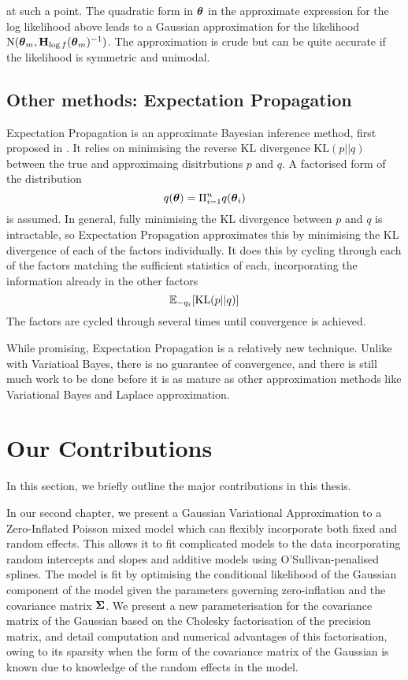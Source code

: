 \noindent at such a point. The quadratic form in ${\boldsymbol \theta}$ in the approximate expression for the log
likelihood above leads to a Gaussian approximation for the likelihood $\text{N}({\boldsymbol \theta}_m, {\bf H}_{\log
f}({\boldsymbol \theta}_m)^{-1})$. The approximation is crude but can be quite accurate if the likelihood is symmetric and
unimodal.

\subsection{Other methods: Expectation Propagation}
Expectation Propagation is an approximate Bayesian inference method, first proposed in \citep{Minka2001}.
It relies on minimising the reverse KL divergence $\text{KL}(p || q)$ between the true and approximaing
disitrbutions $p$ and $q$. A factorised form of the distribution
\[
	q({\boldsymbol \theta}) = \Pi_{i=1}^n q({\boldsymbol \theta}_i)
\]
is assumed. In general, fully minimising the KL divergence between $p$ and $q$ is intractable, so Expectation
Propagation approximates this by minimising the KL divergence of each of the factors individually.
It does this by cycling through each of the factors matching the sufficient statistics of each, incorporating
the information already in the other factors
\[
	{\mathbb E}_{-q_i} [\text{KL}(p || q)]
\]
The factors are cycled through several times until convergence is achieved.

While promising, Expectation Propagation is a relatively new technique.
Unlike with Variatioal Bayes, there is no guarantee of convergence, and there is still much work to be done
before it is as mature as other approximation methods like Variational Bayes and Laplace approximation.

\section{Our Contributions}

In this section, we briefly outline the major contributions in this thesis.

In our second chapter, we present a Gaussian Variational Approximation to a Zero-Inflated Poisson mixed model
which can flexibly incorporate both fixed and random effects. This allows it to fit complicated models
to the data incorporating random intercepts and slopes and additive models using O'Sullivan-penalised splines.
The model is fit by optimising the conditional likelihood of the Gaussian component of the model given the
parameters governing zero-inflation and the covariance matrix ${\boldsymbol \Sigma}$.
We present a new parameterisation for the covariance matrix of the Gaussian based on the Cholesky
factorisation of the precision matrix, and detail computation and numerical advantages of this
factorisation, owing to its sparsity when the form of the covariance matrix of the Gaussian is known due to
knowledge of the random effects in the model.

